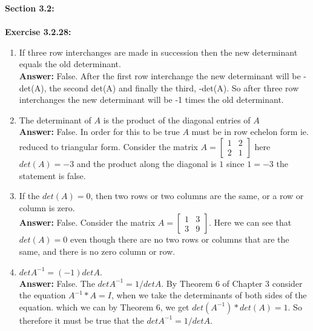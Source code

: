 \documentclass{amsart}
\begin{document}
{\huge\textbf{Section 3.2:}}\\\\
\noindent\textbf{Exercise 3.2.28: } 
\begin{enumerate}


\item If three row interchanges are made in succession then the new determinant equals the old determinant.\\
\noindent \textbf{Answer: } False. After the first row interchange the new determinant will be -det(A), the second  det(A) and finally the third, -det(A). So after three row interchanges the new determinant will be -1 times the old determinant.
\vspace{1in} 




\item The determinant of $A$ is the product of the diagonal entries of $A$\\
\noindent \textbf{Answer: } False. In order for this to be true $A$ must be in row echelon form ie. reduced to triangular form. Consider the matrix $A = \begin{bmatrix} 1 & 2\\ 2&1 \end{bmatrix}$ here $det(A) = -3$ and the product along the diagonal is $1$ since $1 = -3$ the statement is false.  
\vspace{1in} 





\item  If the $det(A) = 0$, then two rows or two columns are the same, or a row or column is zero.\\
\noindent \textbf{Answer: } False. Consider the matrix $A = \begin{bmatrix} 1 & 3\\ 3& 9 \end{bmatrix}$. Here we can see that $det(A) = 0$ even though there are no two rows or columns that are the same, and there is no zero column or row. 
\vspace{1in} 



\item $det A^{-1}  = (-1) det A.$\\
\noindent \textbf{Answer: } False. The $det A^{-1}  = 1/det A$. By Theorem 6 of Chapter 3 consider the equation $A^{-1}*A = I$, when we take the determinants of both sides of the equation. which we can by Theorem 6, we get $det(A^{-1})*det(A) = 1$. So therefore it must be true that the $det A^{-1}  = 1/det A$.


 \vspace{1in} 





\end{enumerate}
\end{document}
